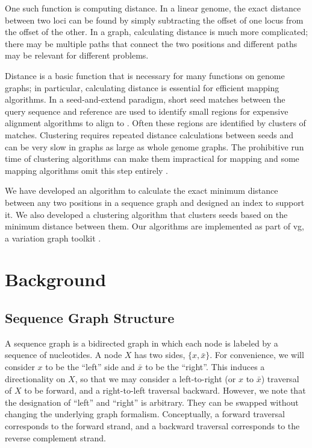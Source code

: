 \documentclass[11pt]{ucscthesis}
\begin{document}
One such function is computing distance.
In a linear genome, the exact distance between two loci can be found by simply subtracting the offset of one locus from the offset of the other.
In a graph, calculating distance is much more complicated; there may be multiple paths that connect the two positions and different paths may be relevant for different problems.

Distance is a basic function that is necessary for many functions on genome graphs; in particular, calculating distance is essential for efficient mapping algorithms.
In a seed-and-extend paradigm, short seed matches between the query sequence and reference are used to identify small regions for expensive alignment algorithms to align to \cite{schneeberger_simultaneous_2009,li_minimap_2016,rakocevic_fast_2019,garrison_variation_2018,vaddadi_read_2019,rautiainen_bit-parallel_2019}. 
Often these regions are identified by clusters of matches. 
Clustering requires repeated distance calculations between seeds and can be very slow in graphs as large as whole genome graphs. 
The prohibitive run time of clustering algorithms can make them impractical for mapping and some mapping algorithms omit this step entirely \cite{rautiainen_bit-parallel_2019}.

We have developed an algorithm to calculate the exact minimum distance between any two positions in a sequence graph and designed an index to support it. We also developed a clustering algorithm that clusters seeds based on the minimum distance between them. Our algorithms are implemented as part of vg, a variation graph toolkit \cite{garrison_variation_2018}.

\section{Background}

\subsection{Sequence Graph Structure}


A sequence graph is a bidirected graph in which each node is labeled by a sequence of nucleotides.
A node $X$ has two sides, $\{x, \bar{x}\}$. For convenience, we will consider $x$  to be the ``left'' side and $\bar x$ to be the ``right''.
This induces a directionality on $X$, so that we may consider a left-to-right (or $x$ to $\bar{x}$) traversal of $X$ to be forward, and a right-to-left traversal backward.
However, we note that the designation of ``left'' and ``right'' is arbitrary.
They can be swapped without changing the underlying graph formalism.
Conceptually, a forward traversal corresponds to the forward strand, and a backward traversal corresponds to the reverse complement strand.
\end{document}
